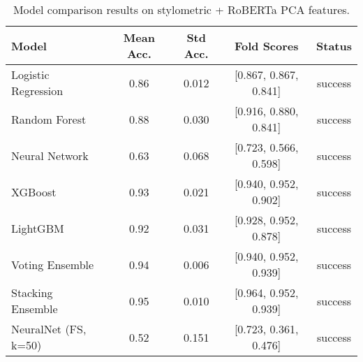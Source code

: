\begin{table}[ht]
\centering
\begin{tabular}{lcccc}
\toprule
Model & Mean Acc. & Std Acc. & Fold Scores & Status \\
\midrule
Logistic Regression & 0.86 & 0.012 & [0.867, 0.867, 0.841] & success \\
Random Forest & 0.88 & 0.030 & [0.916, 0.880, 0.841] & success \\
Neural Network & 0.63 & 0.068 & [0.723, 0.566, 0.598] & success \\
XGBoost & 0.93 & 0.021 & [0.940, 0.952, 0.902] & success \\
LightGBM & 0.92 & 0.031 & [0.928, 0.952, 0.878] & success \\
Voting Ensemble & 0.94 & 0.006 & [0.940, 0.952, 0.939] & success \\
Stacking Ensemble & 0.95 & 0.010 & [0.964, 0.952, 0.939] & success \\
NeuralNet (FS, k=50) & 0.52 & 0.151 & [0.723, 0.361, 0.476] & success \\
\bottomrule
\end{tabular}
\caption{Model comparison results on stylometric + RoBERTa PCA features.}
\label{tab:model_comparison}
\end{table}
